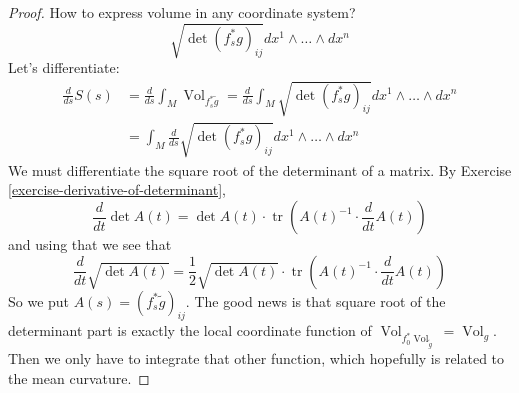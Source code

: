 \begin{proof}
How to express volume in any coordinate system?
\[\sqrt{\det (f^* _sg)_{ij}}dx^1\wedge\ldots\wedge dx^n\]
Let's differentiate:
\begin{align*}
\frac{d}{ds}S(s)&=\frac{d}{ds}\int_M\operatorname{Vol}_{f^*_s\tilde{g}}
=\frac{d}{ds}\int_M \sqrt{\det (f^* _sg)_{ij}}dx^1\wedge\ldots\wedge dx^n\\
&=\int_M \frac{d}{ds}\sqrt{\det (f^* _sg)_{ij}}dx^1\wedge\ldots\wedge dx^n
\end{align*}
We must differentiate the square root of the determinant of a matrix. By
Exercise \ref{exercise-derivative-of-determinant},
$$
\frac{d}{dt}\det A(t)=
\det A(t) \cdot \operatorname{tr}\left(A(t)^{-1}\cdot \frac{d}{dt}A(t)\right)
$$
and using that we see that
$$
\frac{d}{dt}\sqrt{\det A(t)} =\frac{1}{2}\sqrt{\det A(t)} 
\cdot\operatorname{tr}\left(A(t)^{-1}\cdot \frac{d}{dt}A(t)\right)
$$
So we put $A(s)=(f^*_s\tilde{g})_{ij}$. The good news is that square root of the
determinant part is exactly the local coordinate function of
$\operatorname{Vol}_{f_0^*\operatorname{Vol}_{\tilde{g}}}=\operatorname{Vol}_g$.
Then we only have to integrate that other function, which hopefully is related
to the mean curvature.


\end{proof}
